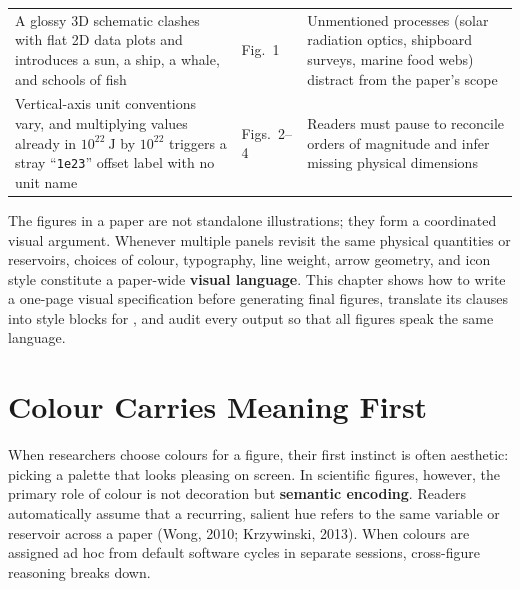 \begin{table}[htbp]
\begin{tabularx}{\linewidth}{@{}Y>{\raggedright\arraybackslash}p{18mm}Y@{}}
A glossy 3D schematic clashes with flat 2D data plots and introduces a sun, a ship, a whale, and schools of fish & Fig.\ 1 & Unmentioned processes (solar radiation optics, shipboard surveys, marine food webs) distract from the paper's scope \\
Vertical-axis unit conventions vary, and multiplying values already in $10^{22}\ \text{J}$ by $10^{22}$ triggers a stray ``\texttt{1e23}'' offset label with no unit name & Figs.\ 2--4 & Readers must pause to reconcile orders of magnitude and infer missing physical dimensions \\
\bottomrule
\end{tabularx}
\end{table}

The figures in a paper are not standalone illustrations; they form a coordinated visual argument. Whenever multiple panels revisit the same physical quantities or reservoirs, choices of colour, typography, line weight, arrow geometry, and icon style constitute a paper-wide \textbf{visual language}. This chapter shows how to write a one-page visual specification before generating final figures, translate its clauses into style blocks for \scidraw{}, and audit every output so that all figures speak the same language.

\section{Colour Carries Meaning First}

When researchers choose colours for a figure, their first instinct is often aesthetic: picking a palette that looks pleasing on screen. In scientific figures, however, the primary role of colour is not decoration but \textbf{semantic encoding}. Readers automatically assume that a recurring, salient hue refers to the same variable or reservoir across a paper (Wong, 2010; Krzywinski, 2013). When colours are assigned ad hoc from default software cycles in separate sessions, cross-figure reasoning breaks down.

